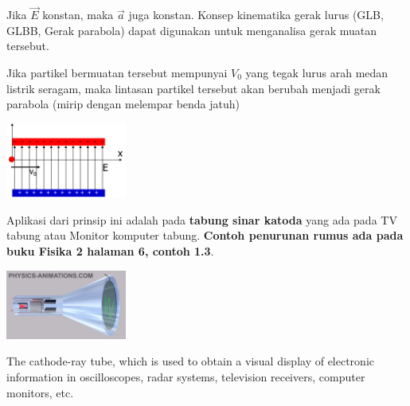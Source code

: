 \documentclass[twocolumn, 11pt]{article}%
\begin{document}
        Jika $\vec E$ konstan, maka $\vec a$ juga konstan. Konsep kinematika gerak lurus (GLB, GLBB, Gerak parabola) dapat digunakan untuk menganalisa gerak muatan tersebut.

        Jika partikel bermuatan tersebut mempunyai $V_0$ yang tegak lurus arah medan listrik seragam, maka lintasan partikel tersebut akan berubah menjadi gerak parabola (mirip dengan melempar benda jatuh)

        \begin{center}
            \includegraphics[width=150px]{6.png}
        \end{center}

        Aplikasi dari prinsip ini adalah pada \textbf{tabung sinar katoda} yang ada pada TV tabung atau Monitor komputer tabung. \textbf{Contoh penurunan rumus ada pada buku Fisika 2 halaman 6, contoh 1.3}.
        
        \begin{center}
            \includegraphics[width=150px]{7.png}
        \end{center}

        The cathode-ray tube, which is used to obtain a visual display of electronic information in oscilloscopes, radar systems, television receivers, computer monitors, etc.
\end{document}
